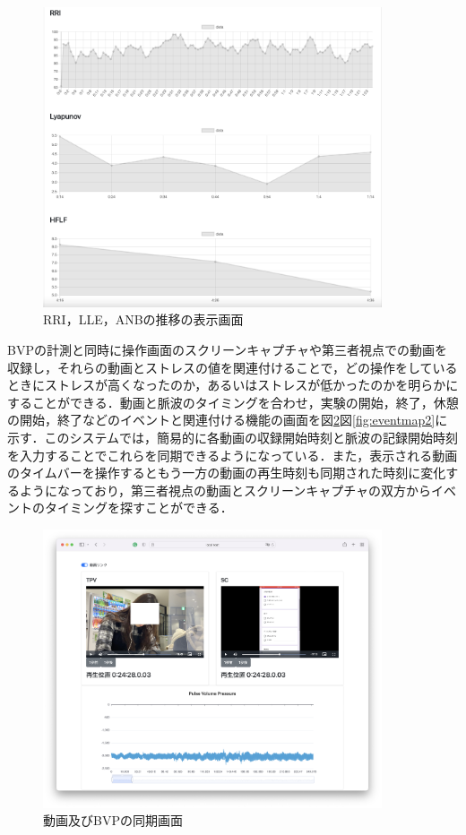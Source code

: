 \begin{figure}[htbp]
  \begin{minipage}{\hsize}
    \begin{center}
       \includegraphics[width=100mm]{img/uxgraph1}
    \end{center}
    \caption{RRI，LLE，ANBの推移の表示画面}
    \label{fig:uxgraph1}
  \end{minipage}
\end{figure}

BVPの計測と同時に操作画面のスクリーンキャプチャや第三者視点での動画を収録し，それらの動画とストレスの値を関連付けることで，どの操作をしているときにストレスが高くなったのか，あるいはストレスが低かったのかを明らかにすることができる．動画と脈波のタイミングを合わせ，実験の開始，終了，休憩の開始，終了などのイベントと関連付ける機能の画面を図\ref{fig:eventmap1}図\ref{fig:eventmap2}に示す．このシステムでは，簡易的に各動画の収録開始時刻と脈波の記録開始時刻を入力することでこれらを同期できるようになっている．また，表示される動画のタイムバーを操作するともう一方の動画の再生時刻も同期された時刻に変化するようになっており，第三者視点の動画とスクリーンキャプチャの双方からイベントのタイミングを探すことができる．

\begin{figure}[htbp]
  \begin{minipage}{\hsize}
    \begin{center}
       \includegraphics[width=100mm]{img/analyzer1}
    \end{center}
    \caption{動画及びBVPの同期画面}
    \label{fig:eventmap1}
  \end{minipage}
\end{figure}

